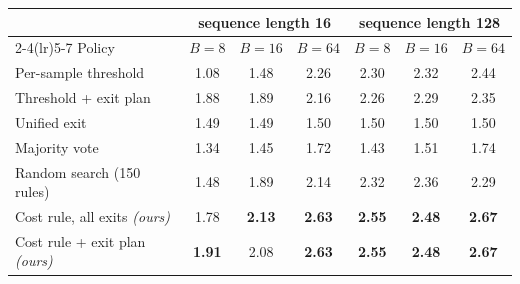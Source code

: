 \begin{tabular}{@{}lcccccc@{}}
\toprule
 & \multicolumn{3}{c}{sequence length 16} & \multicolumn{3}{c}{sequence length 128} \\
\cmidrule(lr){2-4}\cmidrule(lr){5-7}
Policy & $B=8$ & $B=16$ & $B=64$ & $B=8$ & $B=16$ & $B=64$ \\
\midrule
Per-sample threshold & 1.08 & 1.48 & 2.26 & 2.30 & 2.32 & 2.44 \\
Threshold + exit plan & 1.88 & 1.89 & 2.16 & 2.26 & 2.29 & 2.35 \\
Unified exit & 1.49 & 1.49 & 1.50 & 1.50 & 1.50 & 1.50 \\
Majority vote & 1.34 & 1.45 & 1.72 & 1.43 & 1.51 & 1.74 \\
Random search (150 rules) & 1.48 & 1.89 & 2.14 & 2.32 & 2.36 & 2.29 \\
\midrule
Cost rule, all exits \textit{(ours)} & 1.78 & \textbf{2.13} & \textbf{2.63} & \textbf{2.55} & \textbf{2.48} & \textbf{2.67} \\
Cost rule + exit plan \textit{(ours)} & \textbf{1.91} & 2.08 & \textbf{2.63} & \textbf{2.55} & \textbf{2.48} & \textbf{2.67} \\
\bottomrule
\end{tabular}

